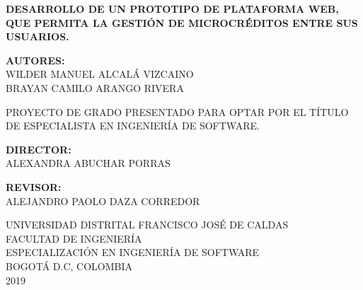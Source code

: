 \begin{titlepage}
	\begin{center}
	\textbf{DESARROLLO DE UN PROTOTIPO DE PLATAFORMA WEB, QUE PERMITA LA GESTIÓN DE MICROCRÉDITOS ENTRE SUS USUARIOS.}\\
	\vspace{2.5cm}
	
	\textbf{AUTORES:}\\
	{WILDER MANUEL ALCALÁ VIZCAINO}\\
	{BRAYAN CAMILO ARANGO RIVERA}\\ 
	\vspace{2.5cm}
	
	{PROYECTO DE GRADO PRESENTADO PARA OPTAR POR EL TÍTULO DE ESPECIALISTA EN INGENIERÍA DE SOFTWARE.}\\
	\vspace{2.5cm}
	
	\textbf{DIRECTOR:}\\
	{ALEXANDRA ABUCHAR PORRAS}\\
	\vspace{1cm}
	
	\textbf{REVISOR:}\\
	{ALEJANDRO PAOLO DAZA CORREDOR}\\
	\vspace{2cm}
	

	
	
	{UNIVERSIDAD DISTRITAL FRANCISCO JOSÉ DE CALDAS}\\
	{FACULTAD DE INGENIERÍA}\\
	{ESPECIALIZACIÓN EN INGENIERÍA DE SOFTWARE}\\
	{BOGOTÁ D.C, COLOMBIA}\\
	{2019}\\
	\end{center}
\end{titlepage}